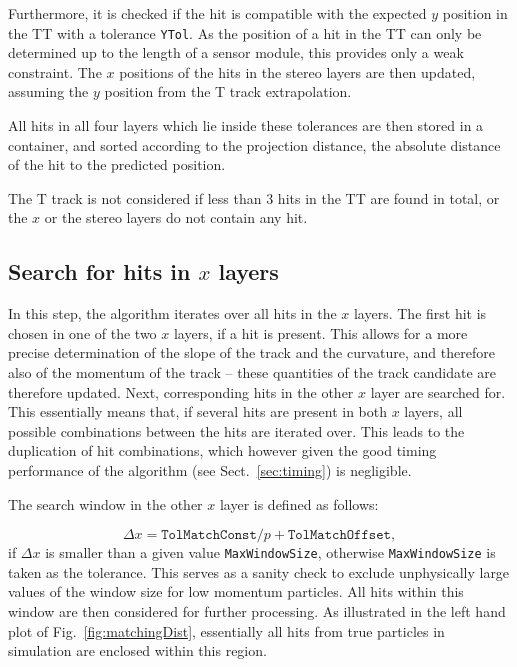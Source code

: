 Furthermore, it is checked if the hit is compatible with the expected $y$
position in the TT with a tolerance \texttt{YTol}. As the position of a hit in the TT can only be determined up to
the length of a sensor module, this provides only a weak constraint. The $x$
positions of the hits in the stereo layers are then updated, assuming the $y$
position from the T track extrapolation.

All hits in all four layers which lie inside these tolerances are then stored in a container, and
sorted according to the projection distance, \ie the absolute distance of
the hit to the predicted position.

The T track is not considered if less than 3 hits in the TT are found in
total, or the $x$ or the stereo layers do not contain any hit.

\subsection[Search for hits in $x$ layers]{Search for hits in {\boldmath $x$} layers}
In this step, the algorithm iterates over all hits in the $x$ layers.
The first hit is chosen in one of the two $x$ layers, if a hit is present. This allows for a more precise
determination of the slope of the track and the curvature, and therefore also of the momentum of
the track -- these quantities of the track candidate
are therefore updated. Next, corresponding hits in the other $x$ layer are
searched for. This essentially means that, if several hits are present in both $x$ layers, 
all possible combinations between the hits are iterated over. This leads to the duplication of hit combinations,
which however given the good timing performance of the algorithm (see Sect.~\ref{sec:timing}) is negligible.

The search window in the other $x$ layer is defined as follows:

\begin{equation}
\Delta x =  \texttt{TolMatchConst} / p + \texttt{TolMatchOffset} ,
\end{equation}
if $\Delta x$ is smaller than a given value \texttt{MaxWindowSize}, otherwise
\texttt{MaxWindowSize} is taken as the tolerance. This serves as a sanity check
to exclude unphysically large values of the window size for low momentum
particles. All hits within this window are then considered for further
processing. As illustrated in the left hand plot of Fig.~\ref{fig:matchingDist}, 
essentially all hits from true particles
in simulation are enclosed within this region.

